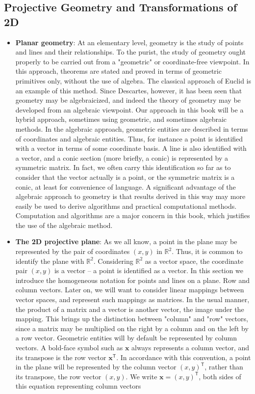 \documentclass{report}
\begin{document}
    \subsection{Projective Geometry and Transformations of 2D}
    \begin{itemize}
        \item \textbf{Planar geometry}:  At an elementary level, geometry is the study of points and lines and their relationships.
            \bigbreak \noindent 
            To the purist, the study of geometry ought properly to be carried out from a "geometric" or coordinate-free viewpoint. In this approach, theorems are stated and proved in terms of geometric primitives only, without the use of algebra. The classical approach of Euclid is an example of this method. Since Descartes, however, it has been seen that geometry may be algebraicized, and indeed the theory of geometry may be developed from an algebraic viewpoint. Our approach in this book will be a hybrid approach, sometimes using geometric, and sometimes algebraic methods. In the algebraic approach, geometric entities are described in terms of coordinates and algebraic entities. Thus, for instance a point is identified with a vector in terms of some coordinate basis. A line is also identified with a vector, and a conic section (more briefly, a conic) is represented by a symmetric matrix. In fact, we often carry this identification so far as to consider that the vector actually is a point, or the symmetric matrix is a conic, at least for convenience of language. A significant advantage of the algebraic approach to geometry is that results derived in this way may more easily be used to derive algorithms and practical computational methods. Computation and algorithms are a major concern in this book, which justifies the use of the algebraic method.
        \item \textbf{The 2D projective plane}: As we all know, a point in the plane may be represented by the pair of coordinates $(x, y)$ in $\mathbb{R}^{2}$. Thus, it is common to identify the plane with $\mathbb{R}^{2} $. Considering $\mathbb{R}^{2} $ as a vector space, the coordinate pair $(x, y)$ is a vector – a point is identified as a vector. In this section we introduce the homogeneous notation for points and lines on a plane.
            \bigbreak \noindent 
            Row and column vectors. Later on, we will want to consider linear mappings between vector spaces, and represent such mappings as matrices. In the usual manner, the product of a matrix and a vector is another vector, the image under the mapping. This brings up the distinction between "column" and "row" vectors, since a matrix may be multiplied on the right by a column and on the left by a row vector. Geometric entities will by default be represented by column vectors. A bold-face symbol such as $\mathbf{x}$ always represents a column vector, and its transpose is the row vector $\mathbf{x}^{\mathsf{T}}$. In accordance with this convention, a point in the plane will be represented by the column vector $(x, y)^{\mathsf{T}}$, rather than its transpose, the row vector $(x, y)$. We write $\mathbf{x}=(x, y)^{\mathsf{T}}$, both sides of this equation representing column vectors

\end{itemize}
\end{document}
